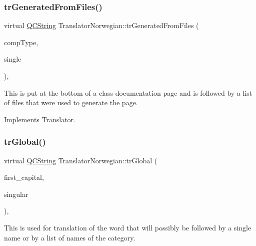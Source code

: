 \mbox{\label{class_translator_norwegian_a96e08286372c9e3c8537de97355f1e00}} 
\subsubsection{\texorpdfstring{trGeneratedFromFiles()}{trGeneratedFromFiles()}}
{\footnotesize\ttfamily virtual \mbox{\hyperlink{class_q_c_string}{Q\+C\+String}} Translator\+Norwegian\+::tr\+Generated\+From\+Files (\begin{DoxyParamCaption}\item[{\mbox{\hyperlink{class_class_def_ae70cf86d35fe954a94c566fbcfc87939}{Class\+Def\+::\+Compound\+Type}}}]{comp\+Type,  }\item[{bool}]{single }\end{DoxyParamCaption})\hspace{0.3cm}{\ttfamily [inline]}, {\ttfamily [virtual]}}

This is put at the bottom of a class documentation page and is followed by a list of files that were used to generate the page. 

Implements \mbox{\hyperlink{class_translator}{Translator}}.

\mbox{\label{class_translator_norwegian_a8e11944b49ebc8039a1b572b550f9018}} 
\subsubsection{\texorpdfstring{trGlobal()}{trGlobal()}}
{\footnotesize\ttfamily virtual \mbox{\hyperlink{class_q_c_string}{Q\+C\+String}} Translator\+Norwegian\+::tr\+Global (\begin{DoxyParamCaption}\item[{bool}]{first\+\_\+capital,  }\item[{bool}]{singular }\end{DoxyParamCaption})\hspace{0.3cm}{\ttfamily [inline]}, {\ttfamily [virtual]}}

This is used for translation of the word that will possibly be followed by a single name or by a list of names of the category. 

